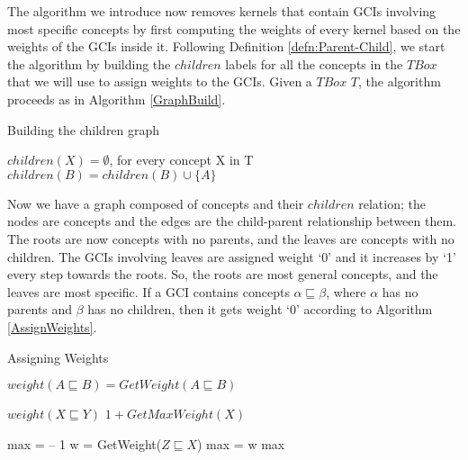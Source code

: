 The algorithm we introduce now removes kernels that contain GCIs involving most specific concepts by first computing the weights of every kernel based on the weights of the GCIs inside it. Following Definition \ref{defn:Parent-Child}, we start the algorithm by building the $children$ labels for all the concepts in the $TBox$ that we will use to assign weights to the GCIs. Given a $TBox$ $T$, the algorithm proceeds as in Algorithm \ref{GraphBuild}.

\begin{algorithm}
\caption{Building the children graph}
\label{GraphBuild}
\begin{algorithmic}[1]
\State $children(X) = \emptyset$, for every concept X in T 
\State $children(B) = children(B) \cup \{ A \}$
\EndFor
\EndFunction
\end{algorithmic}
\end{algorithm}

Now we have a graph composed of concepts and their $children$ relation; the nodes are concepts and the edges are the child-parent relationship between them. The roots are now concepts with no parents, and the leaves are concepts with no children. The GCIs involving leaves are assigned weight `0' and it increases by `1' every step towards the roots. So, the roots are most general concepts, and the leaves are most specific. If a GCI contains concepts $\alpha \sqsubseteq \beta$, where $\alpha$ has no parents and $\beta$ has no children, then it gets weight `0' according to Algorithm \ref{AssignWeights}.

\begin{algorithm}
\caption{Assigning Weights}
\label{AssignWeights}
\begin{algorithmic}[1]
\State $weight(A \sqsubseteq B) = GetWeight(A \sqsubseteq B)$
\EndFor
\EndFunction
\end{algorithmic}

\begin{algorithmic}[1]
\State
\Return $weight(X \sqsubseteq Y)$
\EndIf
{}
\State
{}
\Else
\State
\Return $1 + GetMaxWeight(X)$
\EndIf
\EndFunction
\end{algorithmic}

\begin{algorithmic}[1]
\State max = -- 1
\State w = GetWeight($Z \sqsubseteq X$)
\State max = w
\EndIf
\EndFor
\State
\Return max
\EndFunction
\end{algorithmic}
\end{algorithm}

